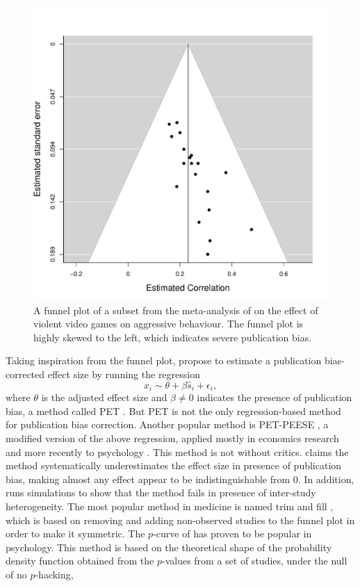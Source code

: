 \begin{figure}
\noindent \begin{centering}
\includegraphics[scale=0.5]{figures/anderson}
\par\end{centering}
\caption{\label{fig:A-funnel-plot}A funnel plot of a subset from the meta-analysis of \textcite{Anderson2010-ki} on the effect of violent video games on aggressive behaviour. The funnel plot is highly skewed to the left, which indicates severe publication bias.}
\end{figure}

Taking inspiration from the funnel plot, \textcite{Egger1998-kj} propose to estimate a publication bias-corrected effect size by running the regression
\[
x_{i}\sim\theta+\beta\widehat{s}_{i}+\epsilon_{i},
\]
where $\theta$ is the adjusted effect size and $\beta\neq0$ indicates the presence of publication bias, a method called PET \parencite{stanley_beyond_2005}. But PET is not the only regression-based method for publication bias
correction. Another popular method is PET-PEESE \parencite{Stanley2014-gx}, a modified version of the above regression, applied mostly in economics research and more recently to psychology \parencite{carter_series_2015}. This method is not without critics. \textcite{gervais_putting_2015} claims the method systematically underestimates the effect size in presence of publication bias, making almost any effect appear to be indistinguishable from $0$. In addition, \textcite{simonsohn_[59]_2017} runs simulations to show that the method fails in presence of inter-study heterogeneity. The most popular method in medicine is named trim and fill \parencite{Duval2000-ct}, which is based on removing and adding non-observed studies to the funnel plot in order to make it symmetric. The $p$-curve of \textcite{simonsohn_p-curve:_2014} has proven to be popular in psychology. This method is based on the theoretical shape of the probability density function obtained from the $p$-values from a set of studies, under the null of no $p$-hacking,

